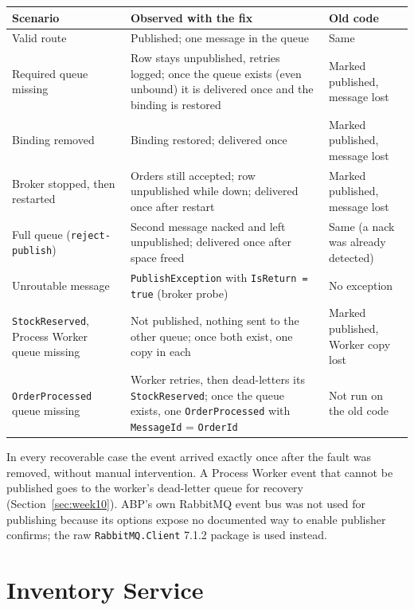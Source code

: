 \documentclass[a4paper]{report}
\begin{document}
\begin{center}
\begin{tabular}{@{}p{4.2cm}p{5.6cm}p{3.4cm}@{}}
\toprule
Scenario & Observed with the fix & Old code \\
\midrule
Valid route & Published; one message in the queue & Same \\
Required queue missing & Row stays unpublished, retries logged; once the queue exists (even unbound) it is delivered once and the binding is restored & Marked published, message lost \\
Binding removed & Binding restored; delivered once & Marked published, message lost \\
Broker stopped, then restarted & Orders still accepted; row unpublished while down; delivered once after restart & Marked published, message lost \\
Full queue (\texttt{reject-publish}) & Second message nacked and left unpublished; delivered once after space freed & Same (a nack was already detected) \\
Unroutable message & \texttt{PublishException} with \texttt{IsReturn = true} (broker probe) & No exception \\
\texttt{StockReserved}, Process Worker queue missing & Not published, nothing sent to the other queue; once both exist, one copy in each & Marked published, Worker copy lost \\
\texttt{OrderProcessed} queue missing & Worker retries, then dead-letters its \texttt{StockReserved}; once the queue exists, one \texttt{OrderProcessed} with \texttt{MessageId} = \texttt{OrderId} & Not run on the old code \\
\bottomrule
\end{tabular}
\end{center}

In every recoverable case the event arrived exactly once after the fault was
removed, without manual intervention. A Process Worker event that cannot be
published goes to the worker's dead-letter queue for recovery
(Section~\ref{sec:week10}). ABP's own RabbitMQ event bus
was not used for publishing because its options expose no documented way to
enable publisher confirms; the raw \texttt{RabbitMQ.Client} 7.1.2 package is
used instead.

\section{Inventory Service}
\label{sec:inventory}
\end{document}
